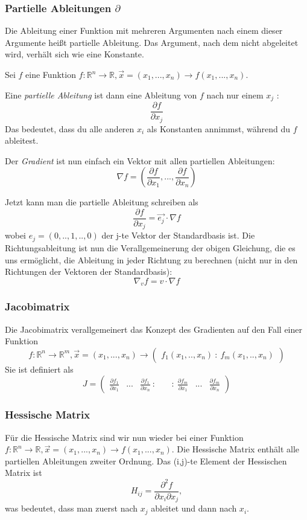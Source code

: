 \documentclass[letterpaper, titlepage]{article}
\begin{document}
\subsubsection{Partielle Ableitungen $\partial$}\label{Partielle Ableitungen}
Die Ableitung einer Funktion mit mehreren Argumenten nach einem dieser Argumente heißt partielle Ableitung. Das Argument, nach dem nicht abgeleitet wird, verhält sich wie eine Konstante.\hfill\break

Sei $f$ eine Funktion $f: \mathbb{R}^n \rightarrow \mathbb{R}, \vec{x}=(x_1, ..., x_n) \rightarrow f(x_1, ..., x_n)$.

Eine \textit{partielle Ableitung} ist dann eine Ableitung von $f$ nach nur einem $x_j$ : $$\frac{\partial f}{\partial x_j}$$
Das bedeutet, dass du alle anderen $x_i$ als Konstanten annimmst, während du $f$ ableitest.

Der \textit{Gradient} ist nun einfach ein Vektor mit allen partiellen Ableitungen:
$$ \nabla f = (\frac{\partial f}{\partial x_1}, ..., \frac{\partial f}{\partial x_n}) $$

Jetzt kann man die partielle Ableitung schreiben als $$\frac{\partial f}{\partial x_j} = \vec{e_j} \cdot \nabla f$$ wobei $e_j = (0,..,1,..,0)$ der j-te Vektor der Standardbasis ist. Die Richtungsableitung ist nun die Verallgemeinerung der obigen Gleichung, die es uns ermöglicht, die Ableitung in jeder Richtung zu berechnen (nicht nur in den Richtungen der Vektoren der Standardbasis):  $$\nabla_v f = v \cdot \nabla f$$

\subsubsection{Jacobimatrix}\label{Jacobimatrix}
Die Jacobimatrix verallgemeinert das Konzept des Gradienten auf den Fall einer Funktion $$f: \mathbb{R}^n \rightarrow \mathbb{R}^m, \vec{x}=(x_1, ..., x_n) \rightarrow \begin{pmatrix} f_1(x_1,..,x_n) \ : \ f_m(x_1, ..,x_n) \end{pmatrix}$$ Sie ist definiert als $$ J = \begin{pmatrix} \frac{\partial f_1}{\partial x_1} & ... & \frac{\partial f_1}{\partial x_n} \ : & \ & : \ \frac{\partial f_m}{\partial x_1} & ... & \frac{\partial f_m}{\partial x_n} \end{pmatrix} $$
\subsubsection{Hessische Matrix}\label{Hessische Matrix}
Für die Hessische Matrix sind wir nun wieder bei einer Funktion $f: \mathbb{R}^n \rightarrow \mathbb{R}, \vec{x}=(x_1, ..., x_n) \rightarrow f(x_1, ..., x_n)$. Die Hessische Matrix enthält alle partiellen Ableitungen zweiter Ordnung. Das (i,j)-te Element der Hessischen Matrix ist $$ H_{ij} = \frac{\partial^2 f}{\partial x_i \partial x_j},$$ was bedeutet, dass man zuerst nach $x_j$ ableitet und dann nach $x_i$.
\end{document}
